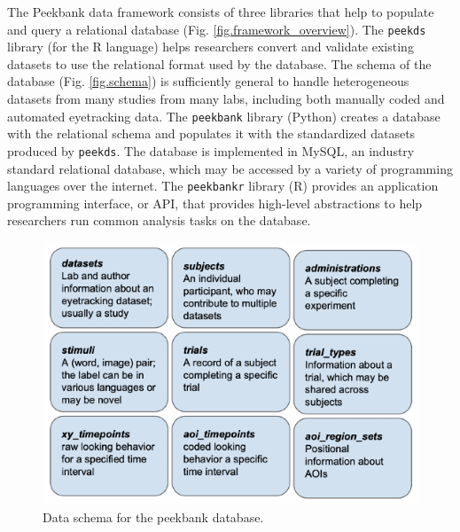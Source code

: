 \documentclass[10pt, letterpaper]{article}
\newenvironment{CodeChunk}{}{}
\begin{document}
The Peekbank data framework consists of three libraries that help to
populate and query a relational database (Fig.
\ref{fig.framework_overview}). The \texttt{peekds} library (for the R
language) helps researchers convert and validate existing datasets to
use the relational format used by the database. The schema of the
database (Fig. \ref{fig.schema}) is sufficiently general to handle
heterogeneous datasets from many studies from many labs, including both
manually coded and automated eyetracking data. The \texttt{peekbank}
library (Python) creates a database with the relational schema and
populates it with the standardized datasets produced by \texttt{peekds}.
The database is implemented in MySQL, an industry standard relational
database, which may be accessed by a variety of programming languages
over the internet. The \texttt{peekbankr} library (R) provides an
application programming interface, or API, that provides high-level
abstractions to help researchers run common analysis tasks on the
database.

\begin{CodeChunk}
\begin{figure}[tb]

{\centering \includegraphics{figs/fig.schema-1} 

}

\caption[Data schema for the peekbank database]{Data schema for the peekbank database.}\label{fig:fig.schema}
\end{figure}
\end{CodeChunk}
\end{document}

